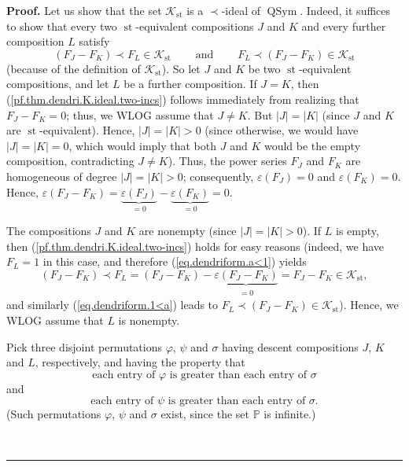 \documentclass[numbers=enddot,12pt,final,onecolumn,notitlepage]{scrartcl}%
\theoremstyle{definition}
\newenvironment{proof}[1][Proof]{\noindent\textbf{#1.} }{\ \rule{0.5em}{0.5em}}
\newenvironment{verlong}{}{}
\begin{document}
\begin{verlong}
\begin{proof}
Let us show that the set $\mathcal{K}_{\operatorname*{st}}$ is a $\left.
\prec\right.  $-ideal of $\operatorname*{QSym}$. Indeed, it suffices to show
that every two $\operatorname*{st}$-equivalent compositions $J$ and $K$ and
every further composition $L$ satisfy%
\begin{equation}
\left(  F_{J}-F_{K}\right)  \left.  \prec\right.  F_{L}\in\mathcal{K}%
_{\operatorname*{st}}\ \ \ \ \ \ \ \ \ \ \text{and}\ \ \ \ \ \ \ \ \ \ F_{L}%
\left.  \prec\right.  \left(  F_{J}-F_{K}\right)  \in\mathcal{K}%
_{\operatorname*{st}} \label{pf.thm.dendri.K.ideal.two-incs}%
\end{equation}
(because of the definition of $\mathcal{K}_{\operatorname*{st}}$). So let $J$
and $K$ be two $\operatorname*{st}$-equivalent compositions, and let $L$ be a
further composition. If $J=K$, then (\ref{pf.thm.dendri.K.ideal.two-incs})
follows immediately from realizing that $F_{J}-F_{K}=0$; thus, we WLOG assume
that $J\neq K$. But $\left\vert J\right\vert =\left\vert K\right\vert $ (since
$J$ and $K$ are $\operatorname*{st}$-equivalent). Hence, $\left\vert
J\right\vert =\left\vert K\right\vert >0$ (since otherwise, we would have
$\left\vert J\right\vert =\left\vert K\right\vert =0$, which would imply that
both $J$ and $K$ would be the empty composition, contradicting $J\neq K$).
Thus, the power series $F_{J}$ and $F_{K}$ are homogeneous of degree
$\left\vert J\right\vert =\left\vert K\right\vert >0$; consequently,
$\varepsilon\left(  F_{J}\right)  =0$ and $\varepsilon\left(  F_{K}\right)
=0$. Hence, $\varepsilon\left(  F_{J}-F_{K}\right)  =\underbrace{\varepsilon
\left(  F_{J}\right)  }_{=0}-\underbrace{\varepsilon\left(  F_{K}\right)
}_{=0}=0$.

The compositions $J$ and $K$ are nonempty (since $\left\vert J\right\vert
=\left\vert K\right\vert >0$). If $L$ is empty, then
(\ref{pf.thm.dendri.K.ideal.two-incs}) holds for easy reasons (indeed, we have
$F_{L}=1$ in this case, and therefore (\ref{eq.dendriform.a<1}) yields
\[
\left(  F_{J}-F_{K}\right)  \left.  \prec\right.  F_{L}=\left(  F_{J}%
-F_{K}\right)  -\underbrace{\varepsilon\left(  F_{J}-F_{K}\right)
}_{\substack{=0}}=F_{J}-F_{K}\in\mathcal{K}_{\operatorname*{st}},
\]
and similarly (\ref{eq.dendriform.1<a}) leads to $F_{L}\left.  \prec\right.
\left(  F_{J}-F_{K}\right)  \in\mathcal{K}_{\operatorname*{st}}$). Hence, we
WLOG assume that $L$ is nonempty.

Pick three disjoint permutations $\varphi$, $\psi$ and $\sigma$ having descent
compositions $J$, $K$ and $L$, respectively, and having the property that%
\[
\text{each entry of }\varphi\text{ is greater than each entry of }\sigma
\]
and%
\[
\text{each entry of }\psi\text{ is greater than each entry of }\sigma\text{.}%
\]
(Such permutations $\varphi$, $\psi$ and $\sigma$ exist, since the set
$\mathbb{P}$ is infinite.)


\end{proof}
\end{verlong}
\end{document}

